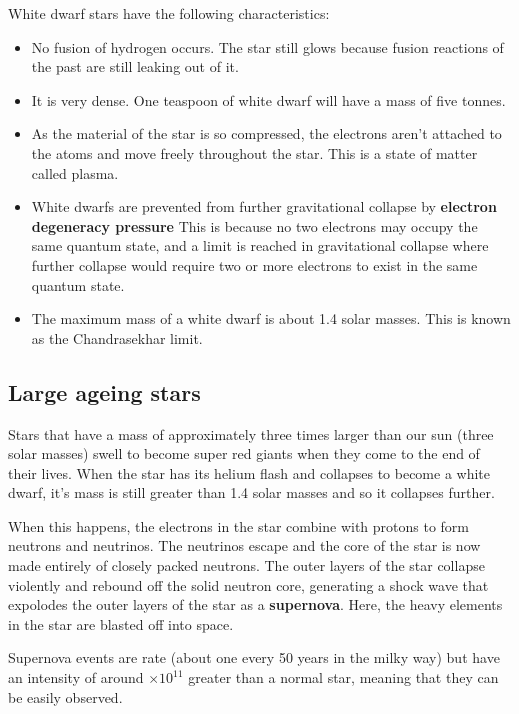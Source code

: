 \documentclass{article}
\begin{document}
White dwarf stars have the following characteristics:

\begin{itemize}

	\item No fusion of hydrogen occurs. The star still glows because fusion
	reactions of the past are still leaking out of it.

	\item It is very dense. One teaspoon of white dwarf will have a mass of five
	tonnes.

    \item As the material of the star is so compressed, the electrons aren't
	attached to the atoms and move freely throughout the star. This is a state of
	matter called plasma.

	\item White dwarfs are prevented from further gravitational collapse by {\bf
	electron degeneracy pressure} This is because no two electrons may occupy
	the same quantum state, and a limit is reached in gravitational collapse
	where further collapse would require two or more electrons to exist in the
	same quantum state.

	\item The maximum mass of a white dwarf is about 1.4 solar masses. This is
	known as the Chandrasekhar limit.

\end{itemize}

\subsection{Large ageing stars}

Stars that have a mass of approximately three times larger than our sun (three
solar masses) swell to become super red giants when they come to the end of
their lives. When the star has its helium flash and collapses to become a white
dwarf, it's mass is still greater than 1.4 solar masses and so it collapses
further.

When this happens, the electrons in the star combine with protons to form
neutrons and neutrinos. The neutrinos escape and the core of the star is now
made entirely of closely packed neutrons. The outer layers of the star collapse
violently and rebound off the solid neutron core, generating a shock wave that
expolodes the outer layers of the star as a {\bf supernova}. Here, the heavy
elements in the star are blasted off into space.

Supernova events are rate (about one every 50 years in the milky way) but have
an intensity of around $\times10^{11}$ greater than a normal star, meaning that
they can be easily observed.
\end{document}
